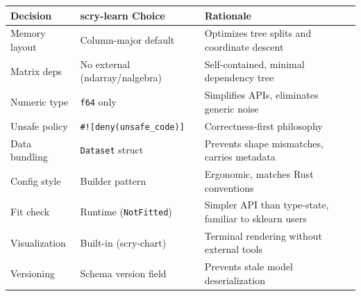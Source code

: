 \documentclass[11pt,a4paper]{article}
\begin{document}
\begin{center}
\begin{tabular}{lp{4.5cm}p{5.5cm}}
\toprule
\textbf{Decision} & \textbf{scry-learn Choice} & \textbf{Rationale} \\
\midrule
Memory layout & Column-major default & Optimizes tree splits and coordinate descent \\
Matrix deps & No external (ndarray/nalgebra) & Self-contained, minimal dependency tree \\
Numeric type & \texttt{f64} only & Simplifies APIs, eliminates generic noise \\
Unsafe policy & \texttt{\#![deny(unsafe\_code)]} & Correctness-first philosophy \\
Data bundling & \texttt{Dataset} struct & Prevents shape mismatches, carries metadata \\
Config style & Builder pattern & Ergonomic, matches Rust conventions \\
Fit check & Runtime (\texttt{NotFitted}) & Simpler API than type-state, familiar to sklearn users \\
Visualization & Built-in (scry-chart) & Terminal rendering without external tools \\
Versioning & Schema version field & Prevents stale model deserialization \\
\bottomrule
\end{tabular}
\end{center}
\end{document}
